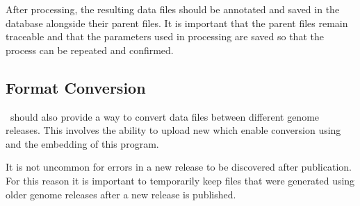 After processing, the resulting data files should be annotated and saved in the database alongside their parent files. It is important that the parent files remain traceable and that the parameters used in processing are saved so that the process can be repeated and confirmed.

\subsection{Format Conversion}
\appName\ should also provide a way to convert  data files between different genome releases. This involves the ability to upload new  which enable conversion using  and the embedding of this program.

It is not uncommon for errors in a new release to be discovered after publication. For this reason it is important to temporarily keep files that were generated using older genome releases after a new release is published.

